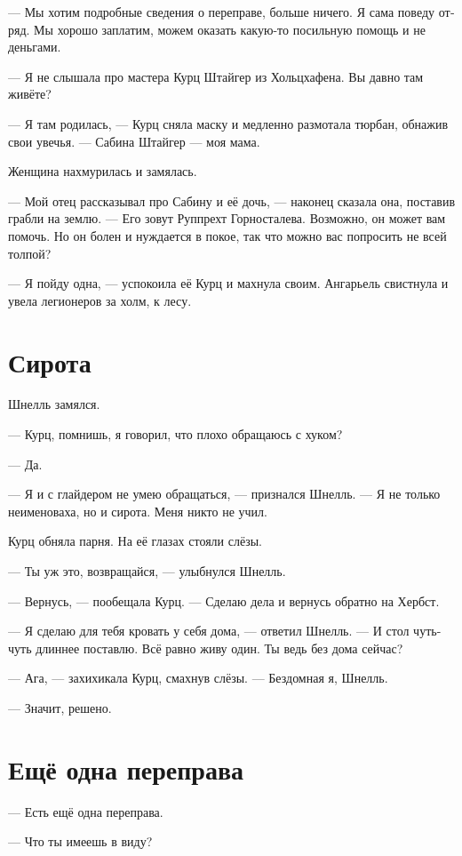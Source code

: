 \documentclass[a4paper,12pt,fleqn]{book}\usepackage{polyglossia}\setdefaultlanguage[babelshorthands=true]{russian}\setotherlanguage{english}\defaultfontfeatures{Ligatures=TeX,Mapping=tex-text}\usepackage{xcolor}\newcommand{\ml}[3]{#2}
\begin{document}
--- Мы хотим подробные сведения о переправе, больше ничего.
Я сама поведу отряд.
Мы хорошо заплатим, можем оказать какую-то посильную помощь и не деньгами.

--- Я не слышала про мастера Курц Штайгер из Хольцхафена.
Вы давно там живёте?

--- Я там родилась, --- Курц сняла маску и медленно размотала тюрбан, обнажив свои увечья.
--- Сабина Штайгер --- моя мама.

Женщина нахмурилась и замялась.

--- Мой отец рассказывал про Сабину и её дочь, --- наконец сказала она, поставив грабли на землю.
\ml{$0$}
{--- Его зовут Руппрехт Горносталева.}
{``His name is Rupprecht Gornostalewa.}
Возможно, он может вам помочь.
Но он болен и нуждается в покое, так что можно вас попросить не всей толпой?

--- Я пойду одна, --- успокоила её Курц и махнула своим.
Ангарьель свистнула и увела легионеров за холм, к лесу.

\section{Сирота}

Шнелль замялся.

--- Курц, помнишь, я говорил, что плохо обращаюсь с хуком?

--- Да.

--- Я и с глайдером не умею обращаться, --- признался Шнелль.
--- Я не только неименоваха, но и сирота.
Меня никто не учил.

Курц обняла парня.
На её глазах стояли слёзы.

--- Ты уж это, возвращайся, --- улыбнулся Шнелль.

--- Вернусь, --- пообещала Курц.
--- Сделаю дела и вернусь обратно на Хербст.

--- Я сделаю для тебя кровать у себя дома, --- ответил Шнелль.
--- И стол чуть-чуть длиннее поставлю.
Всё равно живу один.
Ты ведь без дома сейчас?

--- Ага, --- захихикала Курц, смахнув слёзы.
--- Бездомная я, Шнелль.

--- Значит, решено.

\section{Ещё одна переправа}

--- Есть ещё одна переправа.

--- Что ты имеешь в виду?
\end{document}
